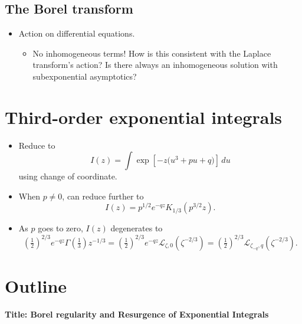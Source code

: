 \documentclass{article}
\newcommand{\laplace}{\mathcal{L}}
\begin{document}
\subsection{The Borel transform}
\begin{itemize}
\item Action on differential equations.
\begin{itemize}
\item No inhomogeneous terms! How is this consistent with the Laplace transform's action? Is there always an inhomogeneous solution with subexponential asymptotics?
\end{itemize}
\end{itemize}
\section{Third-order exponential integrals}
\begin{itemize}
\item Reduce to
\[ I(z) = \int \exp\left[-z\big(u^3 + pu + q)\right]\,du \]
using change of coordinate.
\item When $p \neq 0$, can reduce further to
\[ I(z) = p^{1/2} e^{-qz} K_{1/3}(p^{3/2} z). \]
\item As $p$ goes to zero, $I(z)$ degenerates to
\[ \left(\tfrac{1}{2}\right)^{2/3} e^{-qz} \Gamma(\tfrac{1}{3}) z^{-1/3} = \left(\tfrac{1}{2}\right)^{2/3} e^{-qz} \laplace_{\zeta,0}(\zeta^{-2/3}) = \left(\tfrac{1}{2}\right)^{2/3} \laplace_{\zeta_{-q},q}(\zeta^{-2/3}). \]
\end{itemize}


\color{orange}
\section*{Outline}

\textbf{Title: Borel regularity and Resurgence of Exponential Integrals}
\end{document}
